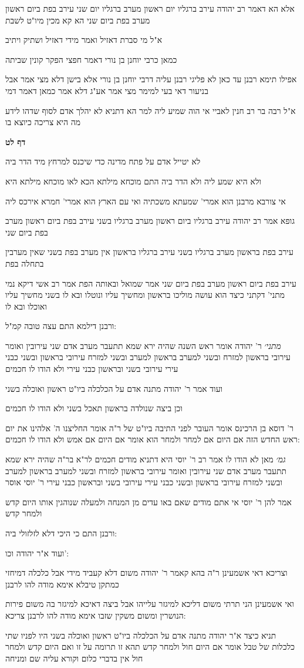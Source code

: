 \documentclass[12pt, openany]{book}
\newcommand{\sethebfont}{
\fontsize{10.5pt}{21.0pt} \selectfont
}
\newcommand{\textblock}[1]{
{\sethebfont #1\\}	
}
\newcommand{\sectname}{}
\newcommand{\newsection}[1]{
	\addcontentsline{toc}{section}{#1}
	\renewcommand{\sectname}{#1}	
	\vspace{-\baselineskip}
	\begin{center}
		\textbf{%
\fontsize{16pt}{16pt}\selectfont
			#1}
	\end{center}
	\vspace{-\baselineskip}
	\nopagebreak
}
\begin{document}
\textblock{אלא הא דאמר רב יהודה עירב ברגליו יום ראשון מערב ברגליו יום שני עירב בפת ביום ראשון מערב בפת ביום שני הא קא מכין מיו"ט לשבת}
\textblock{א"ל מי סברת דאזיל ואמר מידי דאזיל ושתיק ויתיב}
\textblock{כמאן כרבי יוחנן בן נורי דאמר חפצי הפקר קונין שביתה}
\textblock{אפילו תימא רבנן עד כאן לא פליגי רבנן עליה דרבי יוחנן בן נורי אלא בישן דלא מצי אמר אבל בניעור דאי בעי למימר מצי אמר אע"ג דלא אמר כמאן דאמר דמי}
\textblock{א"ל רבה בר רב חנין לאביי אי הוה שמיע ליה למר הא דתניא לא יהלך אדם לסוף שדהו לידע מה היא צריכה כיוצא בו}
\newsection{דף לט}
\textblock{לא יטייל אדם על פתח מדינה כדי שיכנס למרחץ מיד הדר ביה}
\textblock{ולא היא שמע ליה ולא הדר ביה התם מוכחא מילתא הכא לאו מוכחא מילתא היא}
\textblock{אי צורבא מרבנן הוא אמרי' שמעתא משכתיה ואי עם הארץ הוא אמרי' חמרא אירכס ליה}
\textblock{גופא אמר רב יהודה עירב ברגליו ביום ראשון מערב ברגליו בשני עירב בפת ביום ראשון מערב בפת ביום שני}
\textblock{עירב בפת בראשון מערב ברגליו בשני עירב ברגליו בראשון אין מערב בפת בשני שאין מערבין בתחלה בפת}
\textblock{עירב בפת ביום ראשון מערב בפת ביום שני אמר שמואל ובאותה הפת אמר רב אשי דיקא נמי מתני' דקתני כיצד הוא עושה מוליכו בראשון ומחשיך עליו ונוטלו ובא לו בשני מחשיך עליו ואוכלו ובא לו}
\textblock{ורבנן דילמא התם עצה טובה קמ"ל:}
\textblock{{\large\emph{מתני׳}} ר' יהודה אומר ראש השנה שהיה ירא שמא תתעבר מערב אדם שני עירובין ואומר עירובי בראשון למזרח ובשני למערב בראשון למערב ובשני למזרח עירובי בראשון ובשני כבני עירי עירובי בשני ובראשון כבני עירי ולא הודו לו חכמים}
\textblock{ועוד אמר ר' יהודה מתנה אדם על הכלכלה ביו"ט ראשון ואוכלה בשני}
\textblock{וכן ביצה שנולדה בראשון תאכל בשני ולא הודו לו חכמים}
\textblock{ר' דוסא בן הרכינס אומר העובר לפני התיבה ביו"ט של ר"ה אומר החליצנו ה' אלהינו את יום ראש החדש הזה אם היום אם למחר ולמחר הוא אומר אם היום אם אמש ולא הודו לו חכמים:}
\textblock{{\large\emph{גמ׳}} מאן לא הודו לו אמר רב ר' יוסי היא דתניא מודים חכמים לר"א בר"ה שהיה ירא שמא תתעבר מערב אדם שני עירובין ואומר עירובי בראשון למזרח ובשני למערב בראשון למערב ובשני למזרח עירובי בראשון ובשני כבני עירי עירובי בשני ובראשון כבני עירי ר' יוסי אוסר}
\textblock{אמר להן ר' יוסי אי אתם מודים שאם באו עדים מן המנחה ולמעלה שנוהגין אותו היום קדש ולמחר קדש}
\textblock{ורבנן התם כי היכי דלא לזלזולי ביה:}
\textblock{ועוד א"ר יהודה וכו':}
\textblock{וצריכא דאי אשמעינן ר"ה בהא קאמר ר' יהודה משום דלא קעביד מידי אבל כלכלה דמיחזי כמתקן טיבלא אימא מודה להו לרבנן}
\textblock{ואי אשמעינן הני תרתי משום דליכא למיגזר עלייהו אבל ביצה דאיכא למיגזר בה משום פירות הנושרין ומשום משקין שזבו אימא מודה להו לרבנן צריכא:}
\textblock{תניא כיצד א"ר יהודה מתנה אדם על הכלכלה ביו"ט ראשון ואוכלה בשני היו לפניו שתי כלכלות של טבל אומר אם היום חול ולמחר קדש תהא זו תרומה על זו ואם היום קדש ולמחר חול אין בדברי כלום וקורא עליה שם ומניחה}
\end{document}
